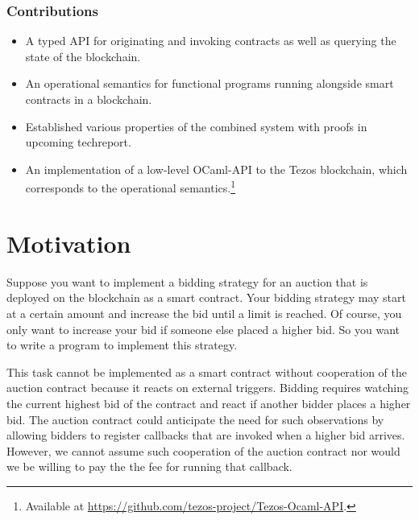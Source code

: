 \documentclass[runningheads]{llncs}
\begin{document}
\subsubsection{Contributions}
\label{sec:contributions}

\begin{itemize}
\item A typed API for originating and invoking contracts as well as
  querying the state of the blockchain.
\item An operational semantics for functional programs running
  alongside smart contracts in a blockchain. 
\item Established various properties of the combined system with
  proofs in upcoming techreport.
\item An implementation of a low-level OCaml-API to the Tezos
  blockchain, which corresponds to the operational semantics.\footnote{%
    Available at \url{https://github.com/tezos-project/Tezos-Ocaml-API}.}
\end{itemize}

\section{Motivation}
\label{sec:motivation}

Suppose you want to implement a bidding strategy for an auction that
is deployed on the blockchain as a smart contract.
Your bidding strategy may start at a certain amount and increase the bid until a
limit is reached. Of course, you only want to increase your bid if
someone else placed a higher bid. So you want to write a
program to implement this strategy.

This task cannot be implemented as a smart contract without
cooperation of the auction contract because it reacts
on external triggers.
Bidding requires watching the current highest bid of the contract and
react if another bidder places a higher bid.
The auction contract could anticipate the need for such observations
by allowing bidders to register callbacks that are invoked when a
higher bid arrives. However, we cannot assume such cooperation of the
auction contract nor would we be willing to pay the the fee for running
that callback.
\end{document}
